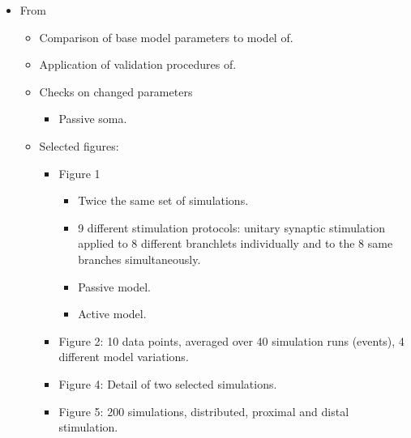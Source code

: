 \documentclass[12pt]{article}
\begin{document}
\begin{itemize}
\item From~\cite{schutter94:_simul_purkin}

  \begin{itemize}
  \item Comparison of base model parameters to model of\cite{E:1994hc}.
  \item Application of validation procedures of\cite{De-Schutter-E:1994vn}.
  \item Checks on changed parameters
    \begin{itemize}
    \item Passive soma.
    \end{itemize}
  \item Selected figures:
    \begin{itemize}
    \item Figure 1
      \begin{itemize}
      \item Twice the same set of simulations.
      \item 9 different stimulation protocols: unitary synaptic
        stimulation applied to 8 different branchlets individually and
        to the 8 same branches simultaneously.
      \item Passive model.
      \item Active model.
      \end{itemize}
    \item Figure 2: 10 data points, averaged over 40 simulation runs
      (events), 4 different model variations.
    \item Figure 4: Detail of two selected simulations.
    \item Figure 5: 200 simulations, distributed, proximal and distal
      stimulation.
    \end{itemize}
  \end{itemize}
\end{itemize}




\end{document}
